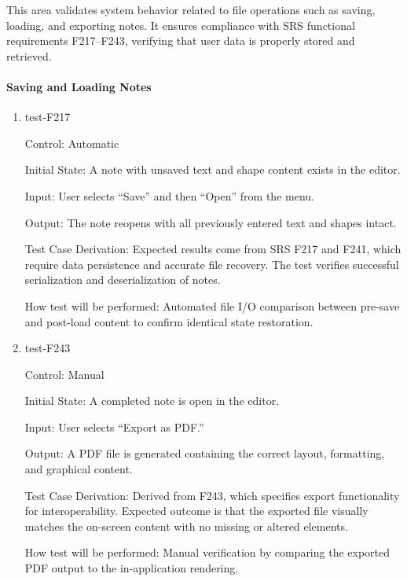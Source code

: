\documentclass[12pt, titlepage]{article}
\begin{document}
This area validates system behavior related to file operations such as saving, loading, and exporting notes.  
It ensures compliance with SRS functional requirements F217–F243, verifying that user data is properly stored and retrieved.

\paragraph{Saving and Loading Notes}

\begin{enumerate}

\item{test-F217\\}

Control: Automatic

Initial State: A note with unsaved text and shape content exists in the editor.

Input: User selects “Save” and then “Open” from the menu.

Output: The note reopens with all previously entered text and shapes intact.

Test Case Derivation: Expected results come from SRS F217 and F241, which require data persistence and accurate file recovery.  
The test verifies successful serialization and deserialization of notes.

How test will be performed: Automated file I/O comparison between pre-save and post-load content to confirm identical state restoration.

\item{test-F243\\}

Control: Manual

Initial State: A completed note is open in the editor.

Input: User selects “Export as PDF.”

Output: A PDF file is generated containing the correct layout, formatting, and graphical content.

Test Case Derivation: Derived from F243, which specifies export functionality for interoperability.  
Expected outcome is that the exported file visually matches the on-screen content with no missing or altered elements.

How test will be performed: Manual verification by comparing the exported PDF output to the in-application rendering.

\end{enumerate}
\end{document}
